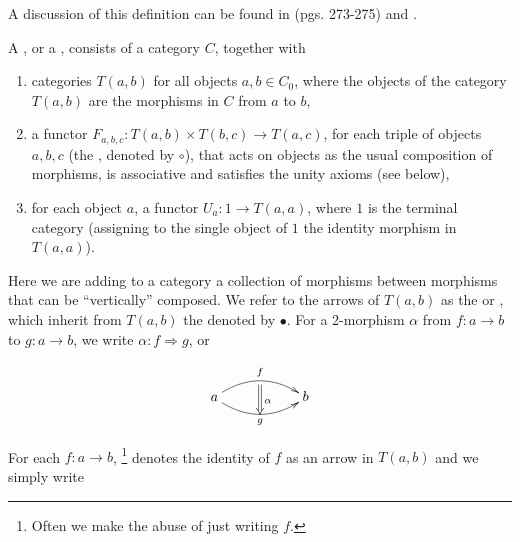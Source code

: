 
A discussion of this definition can be found in \cite{maclane} (pgs. 273-275) and \cite{ncatsbaez}.



\begin{definition}
A , or a , consists of a category $C$, together with \begin{enumerate}
 \item categories $T(a,b)$ for all objects $a,b\in C_0$, where the objects of the category $T(a,b)$ are the morphisms in $C$ from $a$ to $b$,
\item a functor $F_{a,b,c}:T(a,b)\times T(b,c)\rightarrow T(a,c)$, for each triple of objects $a,b,c$ (the , denoted by $\circ$), that acts on objects as the usual composition of morphisms, is associative and satisfies the unity axioms (see below),
\item for each object $a$, a functor $U_a:1\rightarrow T(a,a)$, where $1$ is the terminal category (assigning to the single object of $1$ the identity morphism in $T(a,a)$).
\end{enumerate}
\end{definition}


Here we are adding to a category a collection of morphisms between morphisms that can be ``vertically'' composed. We refer to the arrows of $T(a,b)$ as the  or , which inherit from $T(a,b)$ the  denoted by $\bullet$. For a 2-morphism $\alpha$ from $f:a\rightarrow b$ to $g:a\rightarrow b$, we write $\alpha: f\Rightarrow g$, or 

\[
 \xymatrix{a \ar@/^1pc/[rr]^{f}_{}="0"
           \ar@/_1pc/[rr]_{g}="1"
           \ar@{=>}"0";"1"^{\alpha}
&& b
}
\]

For each $f:a\rightarrow b$, \footnote{Often we make the abuse of just writing $f$.} denotes the identity of $f$ as an arrow in $T(a,b)$ and we simply write

